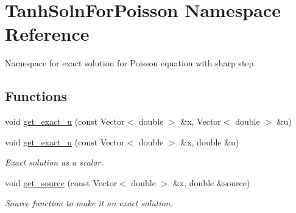 \hypertarget{namespaceTanhSolnForPoisson}{}\section{Tanh\+Soln\+For\+Poisson Namespace Reference}
\label{namespaceTanhSolnForPoisson}


Namespace for exact solution for Poisson equation with sharp step.  


\subsection*{Functions}
\begin{DoxyCompactItemize}
\item 
void \hyperlink{namespaceTanhSolnForPoisson_af7896e9c18ce6438c73ae2a875e8b7de}{get\+\_\+exact\+\_\+u} (const Vector$<$ double $>$ \&x, Vector$<$ double $>$ \&u)
\item 
void \hyperlink{namespaceTanhSolnForPoisson_af197decab980d38d2037032780723984}{get\+\_\+exact\+\_\+u} (const Vector$<$ double $>$ \&x, double \&u)
\begin{DoxyCompactList}\small\item\em Exact solution as a scalar. \end{DoxyCompactList}\item 
void \hyperlink{namespaceTanhSolnForPoisson_ae1b9d6789ff301e3d63a4e292213036c}{get\+\_\+source} (const Vector$<$ double $>$ \&x, double \&source)
\begin{DoxyCompactList}\small\item\em Source function to make it an exact solution. \end{DoxyCompactList}\end{DoxyCompactItemize}
